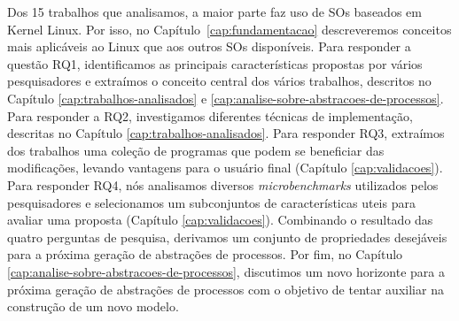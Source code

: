 Dos 15 trabalhos que analisamos, a maior parte faz uso de SOs baseados em
Kernel Linux. Por isso, no Capítulo~\ref{cap:fundamentacao} descreveremos
conceitos mais aplicáveis ao Linux que aos outros SOs disponíveis. Para
responder a questão RQ1, identificamos as principais características propostas
por vários pesquisadores e extraímos o conceito central dos vários trabalhos,
descritos no Capítulo \ref{cap:trabalhos-analisados} e
\ref{cap:analise-sobre-abstracoes-de-processos}. Para responder a RQ2,
investigamos diferentes técnicas de implementação, descritas no Capítulo
\ref{cap:trabalhos-analisados}. Para responder RQ3, extraímos dos trabalhos uma
coleção de programas que podem se beneficiar das modificações, levando
vantagens para o usuário final (Capítulo \ref{cap:validacoes}). Para responder
RQ4, nós analisamos diversos \emph{microbenchmarks} utilizados pelos
pesquisadores e selecionamos um subconjuntos de características uteis para
avaliar uma proposta (Capítulo \ref{cap:validacoes}). Combinando o resultado
das quatro perguntas de pesquisa, derivamos um conjunto de propriedades
desejáveis para a próxima geração de abstrações de processos. Por fim, no
Capítulo \ref{cap:analise-sobre-abstracoes-de-processos}, discutimos um novo
horizonte para a próxima geração de abstrações de processos com o objetivo de
tentar auxiliar na construção de um novo modelo.
